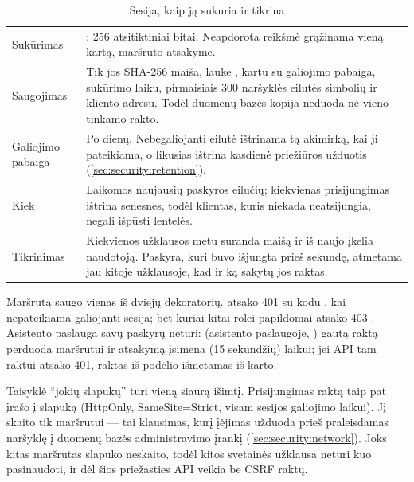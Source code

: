 \begin{table}[H]
\caption{Sesija, kaip ją sukuria ir tikrina }\label{tab:security:session}
\begin{tabularx}{\textwidth}{@{}L{38mm}Y@{}}
\toprule
{} &  \\
\midrule
Sukūrimas & : 256 atsitiktiniai bitai. Neapdorota reikšmė grąžinama vieną kartą, maršruto  atsakyme. \\
Saugojimas & Tik jos SHA-256 maiša, lauke , kartu su galiojimo pabaiga, sukūrimo laiku, pirmaisiais 300 naršyklės  eilutės simbolių ir kliento adresu. Todėl duomenų bazės kopija neduoda nė vieno tinkamo rakto. \\
Galiojimo pabaiga & Po  \code{=}  dienų. Nebegaliojanti eilutė ištrinama tą akimirką, kai ji pateikiama, o likusias ištrina kasdienė priežiūros užduotis (\cref{sec:security:retention}). \\
Kiek & Laikomos  \code{=}  naujausių paskyros eilučių; kiekvienas prisijungimas ištrina senesnes, todėl klientas, kuris niekada neatsijungia, negali išpūsti lentelės. \\
Tikrinimas & Kiekvienos užklausos metu  suranda maišą ir iš naujo įkelia naudotoją. Paskyra, kuri buvo išjungta prieš sekundę, atmetama jau kitoje užklausoje, kad ir ką sakytų jos raktas. \\
\bottomrule
\end{tabularx}
\end{table}

Maršrutą saugo vienas iš dviejų dekoratorių.  atsako 401 su kodu
, kai nepateikiama galiojanti sesija;  bet
kuriai kitai rolei papildomai atsako 403 . Asistento paslauga savų paskyrų
neturi:  (asistento paslaugoje, ) gautą raktą
perduoda maršrutui  ir atsakymą įsimena
 (15 sekundžių) laikui; jei API tam raktui atsako 401, raktas iš
podėlio išmetamas iš karto.

Taisyklė \enquote{jokių slapukų} turi vieną siaurą išimtį. Prisijungimas raktą taip pat įrašo
į slapuką  (HttpOnly, SameSite=Strict, visam sesijos galiojimo laikui).
Jį skaito tik  maršrutui  --- tai
klausimas, kurį įėjimas užduoda prieš praleisdamas naršyklę į duomenų bazės administravimo
įrankį (\cref{sec:security:network}). Joks kitas maršrutas slapuko neskaito, todėl kitos
svetainės užklausa neturi kuo pasinaudoti, ir dėl šios priežasties API veikia be CSRF raktų.

